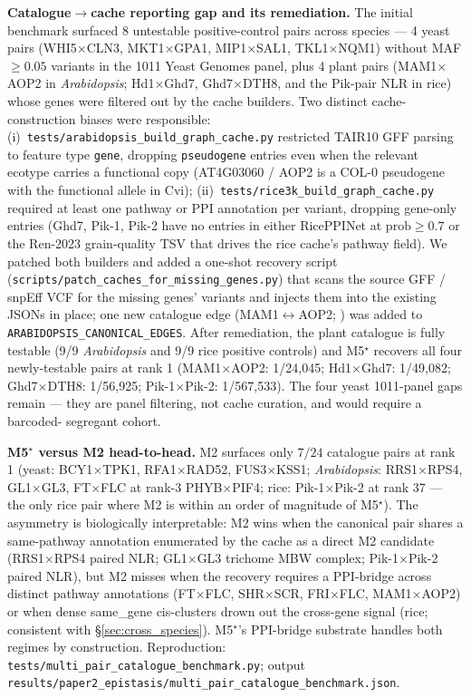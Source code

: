 \textbf{Catalogue$\to$cache reporting gap and its remediation.} The
initial benchmark surfaced 8 untestable positive-control pairs across
species --- 4 yeast pairs (WHI5$\times$CLN3, MKT1$\times$GPA1,
MIP1$\times$SAL1, TKL1$\times$NQM1) without MAF$\geq 0.05$ variants in
the 1011 Yeast Genomes panel, plus 4 plant pairs (MAM1$\times$AOP2 in
\emph{Arabidopsis}; Hd1$\times$Ghd7, Ghd7$\times$DTH8, and the
Pik-pair NLR in rice) whose genes were filtered out by the cache
builders. Two distinct cache-construction biases were responsible:
(i)~\texttt{tests/arabidopsis\_build\_graph\_cache.py} restricted
TAIR10 GFF parsing to feature type \texttt{gene}, dropping
\texttt{pseudogene} entries even when the relevant ecotype carries a
functional copy (AT4G03060 / AOP2 is a COL-0 pseudogene with the
functional allele in Cvi); (ii)~\texttt{tests/rice3k\_build\_graph\_cache.py}
required at least one pathway or PPI annotation per variant, dropping
gene-only entries (Ghd7, Pik-1, Pik-2 have no entries in either
RicePPINet at $\mathrm{prob}\geq 0.7$ or the Ren-2023 grain-quality
TSV that drives the rice cache's pathway field). We patched both
builders and added a one-shot recovery script
(\texttt{scripts/patch\_caches\_for\_missing\_genes.py}) that scans
the source GFF / snpEff VCF for the missing genes' variants and
injects them into the existing JSONs in place; one new catalogue
edge (MAM1$\leftrightarrow$AOP2; \cite{kliebenstein2001gs}) was added
to \texttt{ARABIDOPSIS\_CANONICAL\_EDGES}. After remediation, the
plant catalogue is fully testable (9/9 \emph{Arabidopsis} and 9/9
rice positive controls) and M5$^\star$ recovers all four newly-testable
pairs at rank 1 (MAM1$\times$AOP2: 1/24{,}045; Hd1$\times$Ghd7:
1/49{,}082; Ghd7$\times$DTH8: 1/56{,}925; Pik-1$\times$Pik-2:
1/567{,}533). The four yeast 1011-panel gaps remain --- they are
panel filtering, not cache curation, and would require a barcoded-
segregant cohort.

\textbf{M5$^\star$ versus M2 head-to-head.} M2 surfaces only
$7/24$ catalogue pairs at rank 1 (yeast: BCY1$\times$TPK1,
RFA1$\times$RAD52, FUS3$\times$KSS1; \emph{Arabidopsis}:
RRS1$\times$RPS4, GL1$\times$GL3, FT$\times$FLC at rank-3 PHYB$\times$PIF4;
rice: Pik-1$\times$Pik-2 at rank 37 --- the only rice pair where M2 is
within an order of magnitude of M5$^\star$). The asymmetry is
biologically interpretable: M2 wins when the canonical pair shares a
same-pathway annotation enumerated by the cache as a direct M2
candidate (RRS1$\times$RPS4 paired NLR; GL1$\times$GL3 trichome MBW
complex; Pik-1$\times$Pik-2 paired NLR), but M2 misses when the
recovery requires a PPI-bridge across distinct pathway annotations
(FT$\times$FLC, SHR$\times$SCR, FRI$\times$FLC, MAM1$\times$AOP2) or
when dense same\_gene cis-clusters drown out the cross-gene signal
(rice; consistent with §\ref{sec:cross_species}). M5$^\star$'s
PPI-bridge substrate handles both regimes by construction.
Reproduction: \texttt{tests/multi\_pair\_catalogue\_benchmark.py};
output \texttt{results/paper2\_epistasis/multi\_pair\_catalogue\_benchmark.json}.

